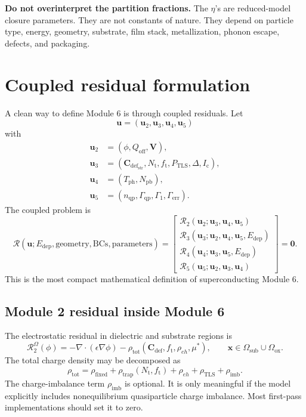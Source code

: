 \documentclass[11pt]{article}
\newcommand{\Osub}{\Omega_{\mathrm{sub}}}
\newcommand{\Oox}{\Omega_{\mathrm{ox}}}
\newcommand{\x}{\bm{x}}
\newcommand{\Edep}{E_{\mathrm{dep}}}
\newcommand{\phiE}{\phi}
\newcommand{\Qoff}{Q_{\mathrm{off}}}
\newcommand{\Vvec}{\bm{V}}
\newcommand{\Cvec}{\bm{C}_{\mathrm{def}}}
\newcommand{\Nt}{N_{\mathrm{t}}}
\newcommand{\ft}{f_{\mathrm{t}}}
\newcommand{\TLS}{\mathrm{TLS}}
\newcommand{\Tph}{T_{\mathrm{ph}}}
\newcommand{\Npb}{N_{\mathrm{pb}}}
\newcommand{\DeltaSC}{\Delta}
\newcommand{\nqp}{n_{\mathrm{qp}}}
\newcommand{\Gammaqp}{\Gamma_{\mathrm{qp}}}
\newcommand{\Gammaone}{\Gamma_1}
\newcommand{\Gammaerr}{\Gamma_{\mathrm{err}}}
\newcommand{\Ic}{I_{\mathrm{c}}}
\newcommand{\mustar}{\mu^*}
\newcommand{\state}{\bm{u}}
\newcommand{\Rtwo}{\mathcal{R}_2}
\newcommand{\Rthree}{\mathcal{R}_3}
\newcommand{\Rfour}{\mathcal{R}_4}
\newcommand{\Rfive}{\mathcal{R}_5}
\begin{document}
\begin{notebox}
\textbf{Do not overinterpret the partition fractions.} The \(\eta\)'s are reduced-model closure parameters. They are not constants of nature. They depend on particle type, energy, geometry, substrate, film stack, metallization, phonon escape, defects, and packaging.
\end{notebox}

\section{Coupled residual formulation}

A clean way to define Module 6 is through coupled residuals. Let
\begin{equation}
\state=\left(\state_2,\state_3,\state_4,\state_5\right)
\end{equation}
with
\begin{align}
\state_2 &= (\phiE,\Qoff,\Vvec),\\
\state_3 &= (\Cvec_{\mathrm{str}},\Nt,\ft,P_{\TLS},\DeltaSC,\Ic),\\
\state_4 &= (\Tph,\Npb),\\
\state_5 &= (\nqp,\Gammaqp,\Gammaone,\Gammaerr).
\end{align}
The coupled problem is
\begin{equation}
\boxed{
\mathcal{R}(\state;\Edep,\mathrm{geometry},\mathrm{BCs},\mathrm{parameters})=
\begin{bmatrix}
\Rtwo(\state_2;\state_3,\state_4,\state_5)\\
\Rthree(\state_3;\state_2,\state_4,\state_5,\Edep)\\
\Rfour(\state_4;\state_3,\state_5,\Edep)\\
\Rfive(\state_5;\state_2,\state_3,\state_4)
\end{bmatrix}=\bm{0}.}
\end{equation}
This is the most compact mathematical definition of superconducting Module 6.

\subsection{Module 2 residual inside Module 6}

The electrostatic residual in dielectric and substrate regions is
\begin{equation}
\Rtwo^{\Omega}(\phiE)=
-\nabla\cdot(\epsilon\nabla\phiE)
-\rho_{\mathrm{tot}}(\Cvec,\ft,\rho_{eh},\mustar),
\qquad \x\in\Osub\cup\Oox.
\end{equation}
The total charge density may be decomposed as
\begin{equation}
\rho_{\mathrm{tot}}
=\rho_{\mathrm{fixed}}+\rho_{\mathrm{trap}}(\Nt,\ft)+\rho_{eh}+\rho_{\mathrm{TLS}}+\rho_{\mathrm{imb}}.
\end{equation}
The charge-imbalance term \(\rho_{\mathrm{imb}}\) is optional. It is only meaningful if the model explicitly includes nonequilibrium quasiparticle charge imbalance. Most first-pass implementations should set it to zero.
\end{document}
